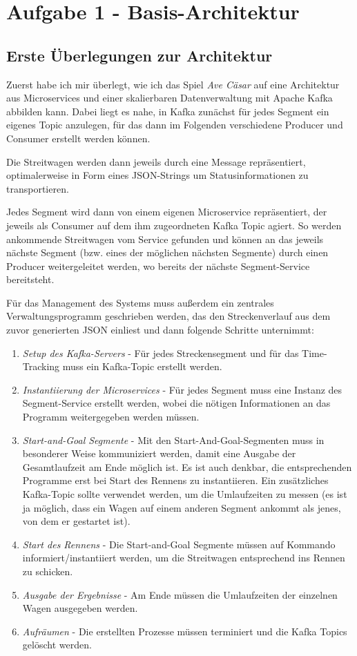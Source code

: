 \documentclass[12pt]{article}
\date{}
\begin{document}
	
\section*{Aufgabe 1 - Basis-Architektur}
\subsection*{Erste Überlegungen zur Architektur}
Zuerst habe ich mir überlegt, wie ich das Spiel \emph{Ave Cäsar} auf eine Architektur aus Microservices und einer skalierbaren Datenverwaltung mit Apache Kafka abbilden kann.
Dabei liegt es nahe, in Kafka zunächst für jedes Segment ein eigenes Topic anzulegen, für das dann im Folgenden verschiedene Producer und Consumer erstellt werden können.

Die Streitwagen werden dann jeweils durch eine Message repräsentiert, optimalerweise in Form eines JSON-Strings um Statusinformationen zu transportieren.
 

Jedes Segment wird dann von einem eigenen Microservice repräsentiert, der jeweils als Consumer auf dem ihm zugeordneten Kafka Topic agiert.
So werden ankommende Streitwagen vom Service gefunden und können an das jeweils nächste Segment (bzw. eines der möglichen nächsten Segmente) durch einen Producer weitergeleitet werden, wo bereits der nächste Segment-Service bereitsteht.

Für das Management des Systems muss außerdem ein zentrales Verwaltungsprogramm geschrieben werden, das den Streckenverlauf aus dem zuvor generierten JSON einliest und dann folgende Schritte unternimmt:

\begin{enumerate}
	\item \emph{Setup des Kafka-Servers} - Für jedes Streckensegment und für das Time-Tracking muss ein Kafka-Topic erstellt werden.
	\item \emph{Instantiierung der Microservices} - Für jedes Segment muss eine Instanz des Segment-Service erstellt werden, wobei die nötigen Informationen an das Programm weitergegeben werden müssen.
	\item \emph{Start-and-Goal Segmente} - Mit den Start-And-Goal-Segmenten muss in besonderer Weise kommuniziert werden, damit eine Ausgabe der Gesamtlaufzeit am Ende möglich ist.
	Es ist auch denkbar, die entsprechenden Programme erst bei Start des Rennens zu instantiieren.
	Ein zusätzliches Kafka-Topic sollte verwendet werden, um die Umlaufzeiten zu messen (es ist ja möglich, dass ein Wagen auf einem anderen Segment ankommt als jenes, von dem er gestartet ist).
	\item \emph{Start des Rennens} - Die Start-and-Goal Segmente müssen auf Kommando informiert/instantiiert werden, um die Streitwagen entsprechend ins Rennen zu schicken.
	\item \emph{Ausgabe der Ergebnisse} - Am Ende müssen die Umlaufzeiten der einzelnen Wagen ausgegeben werden.
	\item \emph{Aufräumen} - Die erstellten Prozesse müssen terminiert und die Kafka Topics gelöscht werden.
\end{enumerate}
\end{document}
